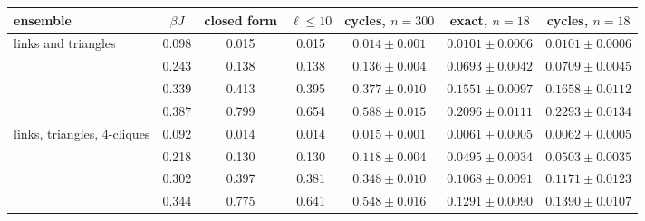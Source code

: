 \begin{tabular}{@{}lcccccc@{}}
\hline\hline
ensemble & $\beta J$ & closed form & $\ell\le10$ & cycles, $n=300$ & exact, $n=18$ & cycles, $n=18$\\
\hline
links and triangles & 0.098 & 0.015 & 0.015 & $0.014\pm0.001$ & $0.0101\pm0.0006$ & $0.0101\pm0.0006$\\
 & 0.243 & 0.138 & 0.138 & $0.136\pm0.004$ & $0.0693\pm0.0042$ & $0.0709\pm0.0045$\\
 & 0.339 & 0.413 & 0.395 & $0.377\pm0.010$ & $0.1551\pm0.0097$ & $0.1658\pm0.0112$\\
 & 0.387 & 0.799 & 0.654 & $0.588\pm0.015$ & $0.2096\pm0.0111$ & $0.2293\pm0.0134$\\
links, triangles, 4-cliques & 0.092 & 0.014 & 0.014 & $0.015\pm0.001$ & $0.0061\pm0.0005$ & $0.0062\pm0.0005$\\
 & 0.218 & 0.130 & 0.130 & $0.118\pm0.004$ & $0.0495\pm0.0034$ & $0.0503\pm0.0035$\\
 & 0.302 & 0.397 & 0.381 & $0.348\pm0.010$ & $0.1068\pm0.0091$ & $0.1171\pm0.0123$\\
 & 0.344 & 0.775 & 0.641 & $0.548\pm0.016$ & $0.1291\pm0.0090$ & $0.1390\pm0.0107$\\
\hline\hline
\end{tabular}
